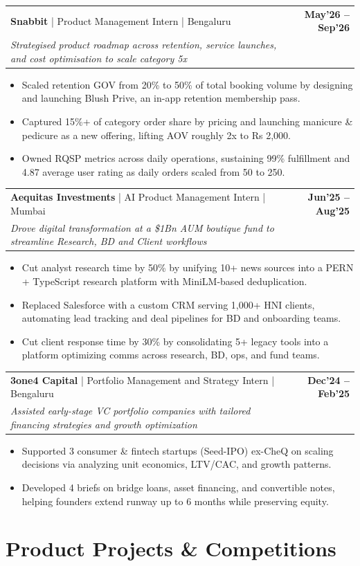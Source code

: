 \documentclass[10pt, a4paper]{article}
\makeatletter
\newcommand{\jobheader}[4]{
  \vspace{-1pt}
  \begin{tabular*}{\textwidth}[t]{l@{\extracolsep{\fill}}r}
    \textbf{#1} \quad | \quad #3 & \textbf{\small #4} \\
    \textit{\small #2} & \\
  \end{tabular*}
  \vspace{-2pt}
}
\newenvironment{achievelist}{
  \begin{itemize}[leftmargin=1.2em, itemsep=0.5pt, parsep=0pt, topsep=1pt]
    \small
}{
  \end{itemize}
  \vspace{-2pt}
}
\newcommand{\achieve}[1]{\item #1}
\makeatother
\begin{document}
\jobheader{Snabbit}{Strategised product roadmap across retention, service launches, and cost optimisation to scale category 5x}{Product Management Intern | Bengaluru}{May'26 -- Sep'26}
\begin{achievelist}
  \achieve{Scaled retention GOV from 20\% to 50\% of total booking volume by designing and launching Blush Prive, an in-app retention membership pass.}
  \achieve{Captured 15\%+ of category order share by pricing and launching manicure \& pedicure as a new offering, lifting AOV roughly 2x to Rs 2,000.}
  \achieve{Owned RQSP metrics across daily operations, sustaining 99\% fulfillment and 4.87 average user rating as daily orders scaled from 50 to 250.}
\end{achievelist}

\jobheader{Aequitas Investments}{Drove digital transformation at a \$1Bn AUM boutique fund to streamline Research, BD and Client workflows}{AI Product Management Intern | Mumbai}{Jun'25 -- Aug'25}
\begin{achievelist}
  \achieve{Cut analyst research time by 50\% by unifying 10+ news sources into a PERN + TypeScript research platform with MiniLM-based deduplication.}
  \achieve{Replaced Salesforce with a custom CRM serving 1,000+ HNI clients, automating lead tracking and deal pipelines for BD and onboarding teams.}
  \achieve{Cut client response time by 30\% by consolidating 5+ legacy tools into a platform optimizing comms across research, BD, ops, and fund teams.}
\end{achievelist}

\jobheader{3one4 Capital}{Assisted early-stage VC portfolio companies with tailored financing strategies and growth optimization}{Portfolio Management and Strategy Intern | Bengaluru}{Dec'24 -- Feb'25}
\begin{achievelist}
  \achieve{Supported 3 consumer \& fintech startups (Seed-IPO) ex-CheQ on scaling decisions via analyzing unit economics, LTV/CAC, and growth patterns.}
  \achieve{Developed 4 briefs on bridge loans, asset financing, and convertible notes, helping founders extend runway up to 6 months while preserving equity.}
\end{achievelist}

\vspace{-2pt}

\section{Product Projects \& Competitions}
\end{document}
